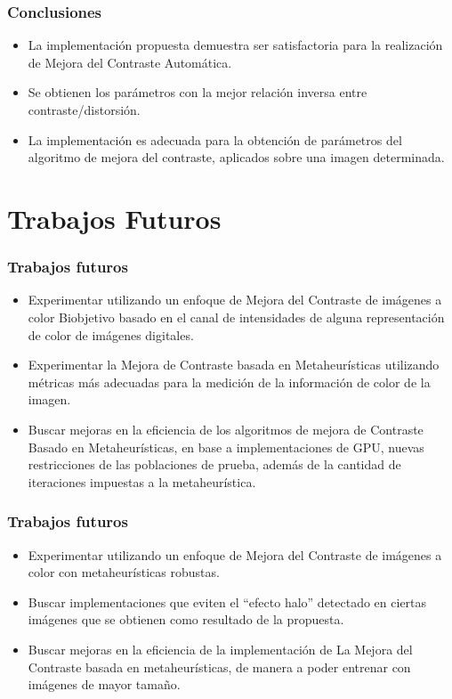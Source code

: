 \documentclass[usenames,dvipsnames]{beamer}
\begin{document}
\begin{frame}
\frametitle{Conclusiones} 
\begin{exampleblock}{}
\begin{itemize}
	\item La implementación propuesta demuestra ser satisfactoria para la realización de Mejora del Contraste Automática.
	\item Se obtienen los parámetros con la mejor relación inversa entre contraste/distorsión.
	\item La implementación es adecuada para la obtención de parámetros del algoritmo de mejora del contraste, aplicados sobre una imagen determinada.
\end{itemize}
\end{exampleblock}
\end{frame}


\section{Trabajos Futuros}

\begin{frame}
\frametitle{Trabajos futuros} 
\begin{exampleblock}{}
\begin{itemize}
	\item Experimentar utilizando un enfoque de Mejora del Contraste de imágenes a color Biobjetivo basado en el canal de intensidades de alguna representación de color de imágenes digitales.
	\item Experimentar la Mejora de Contraste basada en Metaheurísticas utilizando métricas más adecuadas para la medición de la información de color de la imagen.
	\item Buscar mejoras en la eficiencia de los algoritmos de mejora de Contraste Basado en Metaheurísticas, en base a implementaciones de GPU, nuevas restricciones de las poblaciones de prueba, además de la cantidad de iteraciones impuestas a la metaheurística.
\end{itemize}
\end{exampleblock}
\end{frame}

\begin{frame}
\frametitle{Trabajos futuros} 
\begin{exampleblock}{}
\begin{itemize}
	\item Experimentar utilizando un enfoque de Mejora del Contraste de imágenes a color con metaheurísticas robustas.
	\item Buscar implementaciones que eviten el ``efecto halo'' detectado en ciertas imágenes que se obtienen como resultado de la propuesta.
	\item Buscar mejoras en la eficiencia de la implementación de La Mejora del Contraste basada en metaheurísticas, de manera a poder entrenar con imágenes de mayor tamaño.
\end{itemize}
\end{exampleblock}
\end{frame}
\end{document}
